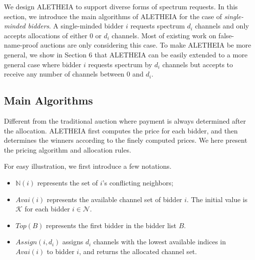 \documentclass{sig-alternate}
\begin{document}

We design ALETHEIA to support diverse forms of spectrum requests. In this section, we introduce the main algorithms of ALETHEIA for the case of \textit{single-minded bidders}. A single-minded bidder $i$ requests spectrum $d_i$ channels and only accepts allocations of either 0 or $d_i$ channels. Most of existing work on false-name-proof auctions are only considering this case. To make ALETHEIA be more general, we show in Section 6 that ALETHEIA can be easily extended to a more general case where bidder $i$ requests spectrum by $d_i$ channels but accepts to receive any number of channels between 0 and $d_i$.

\subsection{Main Algorithms}
Different from the traditional auction where payment is always determined after the allocation. ALETHEIA first computes the price for each bidder, and then determines the winners according to the finely computed prices.  We here present the pricing algorithm and allocation rules.

For easy illustration, we first introduce a few notations.

\begin{itemize}
\item $\mathbb{N}(i)$ represents the set of $i$'s conflicting neighbors;
\item $Avai(i)$ represents the available channel set of bidder $i$. The initial value is $\mathcal{K}$ for each bidder $i\in \mathcal{N}$.
\item $Top(B)$ represents the first bidder in the bidder list $B$.
\item $Assign(i,d_i)$ assigns $d_i$ channels with the lowest available indices in $Avai(i)$ to bidder $i$, and returns the allocated channel set.
\end{itemize}
\end{document}
